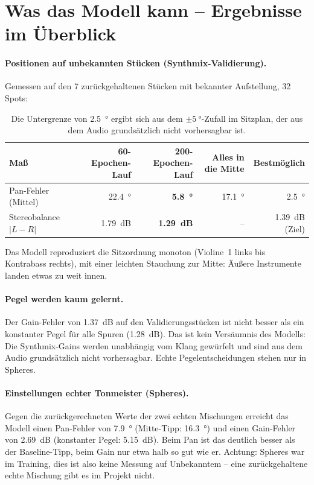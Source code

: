 \documentclass[11pt,a4paper]{article}
\begin{document}
\section{Was das Modell kann -- Ergebnisse im Überblick}

\paragraph{Positionen auf unbekannten Stücken (Synthmix-Validierung).}
Gemessen auf den 7 zurückgehaltenen Stücken mit bekannter Aufstellung,
32 Spots:

\begin{table}[h]
\centering\small
\begin{tabular}{@{}lrrrr@{}}
\toprule
Maß & 60-Epochen-Lauf & \textbf{200-Epochen-Lauf} & Alles in die Mitte & Bestmöglich \\
\midrule
Pan-Fehler (Mittel) & \SI{22.4}{\degree} & \textbf{\SI{5.8}{\degree}} & \SI{17.1}{\degree} & \SI{2.5}{\degree} \\
Stereobalance $|L-R|$ & \SI{1.79}{dB} & \textbf{\SI{1.29}{dB}} & -- & \SI{1.39}{dB} (Ziel) \\
\bottomrule
\end{tabular}
\caption{Die Untergrenze von \SI{2.5}{\degree} ergibt sich aus dem
$\pm\SI{5}{\degree}$-Zufall im Sitzplan, der aus dem Audio grundsätzlich nicht
vorhersagbar ist.}
\end{table}

Das Modell reproduziert die Sitzordnung monoton (Violine~1 links bis
Kontrabass rechts), mit einer leichten Stauchung zur Mitte: Äußere Instrumente
landen etwas zu weit innen.

\paragraph{Pegel werden kaum gelernt.} Der Gain-Fehler von \SI{1.37}{dB} auf
den Validierungsstücken ist nicht besser als ein konstanter Pegel für alle
Spuren (\SI{1.28}{dB}). Das ist kein Versäumnis des Modells: Die Synthmix-Gains
werden unabhängig vom Klang gewürfelt und sind aus dem Audio grundsätzlich
nicht vorhersagbar. Echte Pegelentscheidungen stehen nur in Spheres.

\paragraph{Einstellungen echter Tonmeister (Spheres).} Gegen die
zurückgerechneten Werte der zwei echten Mischungen erreicht das Modell einen
Pan-Fehler von \SI{7.9}{\degree} (Mitte-Tipp: \SI{16.3}{\degree}) und einen
Gain-Fehler von \SI{2.69}{dB} (konstanter Pegel: \SI{5.15}{dB}). Beim Pan ist
das deutlich besser als der Baseline-Tipp, beim Gain nur etwa halb so gut wie
er. Achtung: Spheres war im Training, dies ist also keine Messung auf
Unbekanntem -- eine zurückgehaltene echte Mischung gibt es im Projekt nicht.
\end{document}
